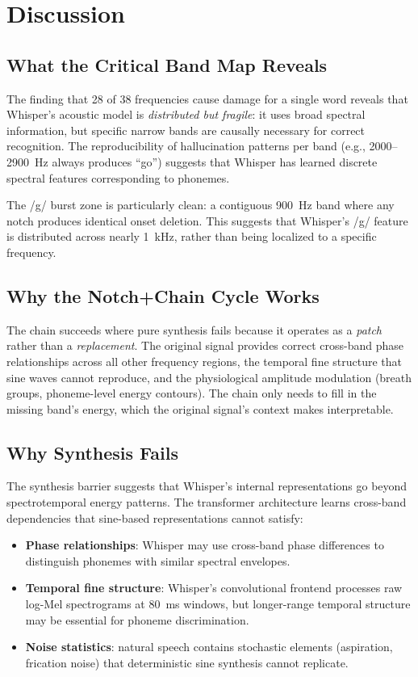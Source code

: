 \documentclass[11pt,a4paper]{article}
\begin{document}
\section{Discussion}

\subsection{What the Critical Band Map Reveals}
The finding that 28 of 38 frequencies cause damage for a single word reveals
that Whisper's acoustic model is \emph{distributed but fragile}: it uses broad
spectral information, but specific narrow bands are causally necessary for
correct recognition. The reproducibility of hallucination patterns per band
(e.g., 2000--2900~Hz always produces ``go'') suggests that Whisper has learned
discrete spectral features corresponding to phonemes.

The /g/ burst zone is particularly clean: a contiguous 900~Hz band where any
notch produces identical onset deletion. This suggests that Whisper's /g/
feature is distributed across nearly 1~kHz, rather than being localized to a
specific frequency.

\subsection{Why the Notch+Chain Cycle Works}
The chain succeeds where pure synthesis fails because it operates as a
\emph{patch} rather than a \emph{replacement}. The original signal provides
correct cross-band phase relationships across all other frequency regions, the
temporal fine structure that sine waves cannot reproduce, and the physiological
amplitude modulation (breath groups, phoneme-level energy contours). The chain
only needs to fill in the missing band's energy, which the original signal's
context makes interpretable.

\subsection{Why Synthesis Fails}
The synthesis barrier suggests that Whisper's internal representations go beyond
spectrotemporal energy patterns. The transformer architecture learns cross-band
dependencies that sine-based representations cannot satisfy:

\begin{itemize}[leftmargin=*,itemsep=2pt]
    \item \textbf{Phase relationships}: Whisper may use cross-band phase
        differences to distinguish phonemes with similar spectral envelopes.
    \item \textbf{Temporal fine structure}: Whisper's convolutional frontend
        processes raw log-Mel spectrograms at 80~ms windows, but longer-range
        temporal structure may be essential for phoneme discrimination.
    \item \textbf{Noise statistics}: natural speech contains stochastic elements
        (aspiration, frication noise) that deterministic sine synthesis cannot
        replicate.
\end{itemize}
\end{document}
